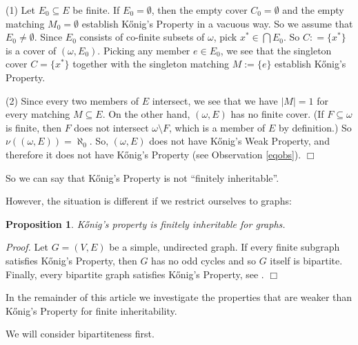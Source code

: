 \documentclass[12pt]{amsart}
\newtheorem{proposition}[lemma]{\bf Proposition}
\newcommand{\proofend}{{\hfill $\Box$}}
\begin{document}
(1) Let $E_0\subseteq E$ be finite. If $E_0 =\emptyset$, then
the empty cover $C_0 = \emptyset$ and the empty matching $M_0 = \emptyset$
establish K\H{o}nig's Property
in a vacuous way. So we assume that $E_0 \neq \emptyset$.
Since $E_0$ consists of co-finite
subsets of $\omega$, pick $x^* \in \bigcap E_0$. So $C : = \{x^*\}$ is
a cover of $(\omega, E_0)$. Picking any member $e \in E_0$, we see
that the singleton cover $C = \{x^*\}$ together with the
singleton matching $M := \{e\}$ establish K\H{o}nig's Property.

(2) Since every two members of $E$ intersect, we see that
we have $|M| = 1$ for every matching $M\subseteq E$. On the other hand,
$(\omega, E)$ has no finite cover. (If $F\subseteq \omega$ is finite,
then $F$ does not intersect $\omega\setminus F$, which is a member of $E$
by definition.) So $\nu((\omega, E)) = \aleph_0$. So, $(\omega, E)$ 
does not have K\H{o}nig's Weak Property, and therefore 
it does not have  K\H{o}nig's Property (see Observation \ref{eqobs}). \proofend

So we can say that K\H{o}nig's Property is not ``finitely inheritable''.

However, the situation is different if we restrict ourselves
to graphs:

\begin{proposition} \label{finiteineritability}
K\H{o}nig's property is finitely inheritable for graphs.
\end{proposition}
{\em Proof.} Let $G = (V,E)$ be a simple, undirected graph.
If every finite subgraph satisfies K\H{o}nig's Property, then
$G$ has no odd cycles and so $G$ itself is bipartite.
Finally, every bipartite graph satisfies K\H{o}nig's Property,
see \cite{Ah2}. \proofend

In the remainder of this article we investigate the properties
that are weaker than K\H{o}nig's Property for finite inheritability.

We will consider bipartiteness first. 
\end{document}
